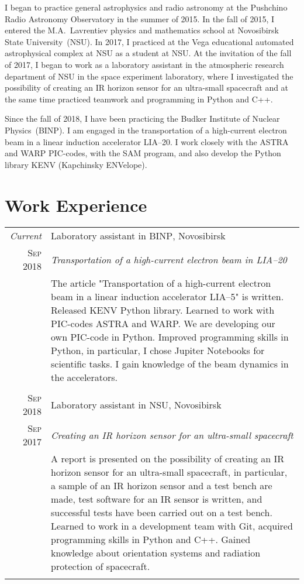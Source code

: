 \documentclass[a4paper,12pt]{article}
\begin{document}
I began to practice general astrophysics and radio astronomy at the Pushchino Radio Astronomy Observatory in the summer of 2015. In the fall of 2015, I entered the M.A.~Lavrentiev physics and mathematics school at Novosibirsk State University~(NSU). In 2017, I practiced at the Vega educational automated astrophysical complex at NSU as a student at NSU. At the invitation of the fall of 2017, I began to work as a laboratory assistant in the atmospheric research department of NSU in the space experiment laboratory, where I investigated the possibility of creating an IR horizon sensor for an ultra-small spacecraft and at the same time practiced teamwork and programming in Python and C++.

Since the fall of 2018, I have been practicing the Budker Institute of Nuclear Physics~(BINP). I am engaged in the transportation of a high-current electron beam in a linear induction accelerator LIA--20. I work closely with the ASTRA and WARP PIC-codes, with the SAM program, and also develop the Python library KENV (Kapchinsky ENVelope).

\section{Work Experience}
\begin{tabular}{r|p{11cm}}
 \emph{Current} & Laboratory assistant in \textsc{BINP}, Novosibirsk \\\textsc{Sep 2018}&\emph{Transportation of a high-current electron beam in LIA--20}\\&\footnotesize{The article "Transportation of a high-current electron beam in a linear induction accelerator LIA--5" is written. Released KENV Python library. Learned to work with PIC-codes ASTRA and WARP. We are developing our own PIC-code in Python. Improved programming skills in Python, in particular, I chose Jupiter Notebooks for scientific tasks. I gain knowledge of the beam dynamics in the accelerators. }\\\multicolumn{2}{c}{} \\
 \textsc{Sep 2018} & Laboratory assistant in \textsc{NSU}, Novosibirsk \\\textsc{Sep 2017}&\emph{Creating an IR horizon sensor for an ultra-small spacecraft}\\&\footnotesize{A report is presented on the possibility of creating an IR horizon sensor for an ultra-small spacecraft, in particular, a sample of an IR horizon sensor and a test bench are made, test software for an IR sensor is written, and successful tests have been carried out on a test bench. Learned to work in a development team with Git, acquired programming skills in Python and C++. Gained knowledge about orientation systems and radiation protection of spacecraft.}\\\multicolumn{2}{c}{} \\
\end{tabular}
\end{document}
